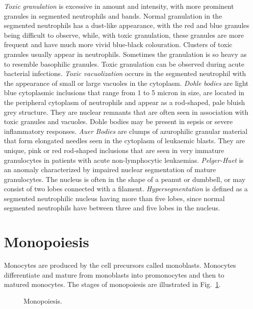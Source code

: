 \documentclass[final,a4paper,12pt,english]{UnicaPhdThesis3}
\begin{document}
	\textit{Toxic granulation} is excessive in amount and intensity, with more prominent granules in segmented neutrophils and bands. Normal granulation in the segmented neutrophils has a dust-like appearance, with the red and blue granules being difficult to observe, while, with toxic granulation, these granules are more frequent and have much more vivid blue-black colouration. Clusters of toxic granules usually appear in neutrophils. Sometimes the granulation is so heavy as to resemble basophilic granules. Toxic granulation can be observed during acute bacterial infections. \textit{Toxic vacuolization} occurs in the segmented neutrophil with the appearance of small or large vacuoles in the cytoplasm. \textit{Dohle bodies} are light blue cytoplasmic inclusions that range from 1 to 5 micron in size, are located in the peripheral cytoplasm of neutrophils and appear as a rod-shaped, pale bluish grey structure. They are nuclear remnants that are often seen in association with toxic granules and vacuoles. Dohle bodies may be present in sepsis or severe inflammatory responses. \textit{Auer Bodies} are clumps of azurophilic granular material that form elongated needles seen in the cytoplasm of leukaemic blasts. They are unique, pink or red rod-shaped inclusions that are seen in very immature granulocytes in patients with acute non-lymphocytic leukaemias. \textit{Pelger-Huet} is an anomaly characterized by impaired nuclear segmentation of mature granulocytes. The nucleus is often in the shape of a peanut or dumbbell, or may consist of two lobes connected with a filament. \textit{Hypersegmentation} is defined as a segmented neutrophilic nucleus having more than five lobes, since normal segmented neutrophils have between three and five lobes in the nucleus. 
	
	\section{Monopoiesis}
	Monocytes are produced by the cell precursors called monoblasts. Monocytes differentiate and mature from monoblasts into promonocytes and then to matured monocytes. The stages of monopoiesis are illustrated in Fig.~\ref{fig:Monopoiesis}.
	
	\begin{figure}[!htbp]
		\centering
		\caption{\label{fig:Monopoiesis} Monopoiesis.}
	\end{figure}
	
\end{document}
